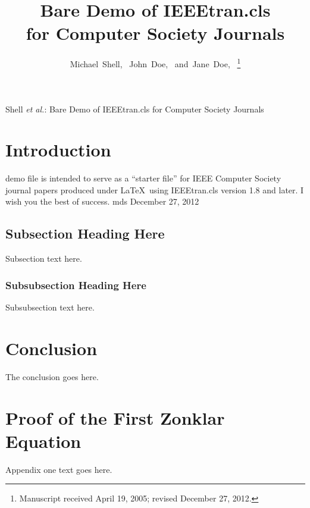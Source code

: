 \documentclass[12pt,journal,compsoc]{IEEEtran}
\begin{document}
\title{Bare Demo of IEEEtran.cls\\ for Computer Society Journals}
\author{Michael~Shell,~
        John~Doe,~
        and~Jane~Doe,~%
\thanks{Manuscript received April 19, 2005; revised December 27, 2012.}}
%
{Shell \MakeLowercase{\textit{et al.}}: Bare Demo of IEEEtran.cls for Computer Society Journals}
\maketitle
\IEEEdisplaynontitleabstractindextext
\IEEEpeerreviewmaketitle
\section{Introduction}
 demo file is intended to serve as a ``starter file''
for IEEE Computer Society journal papers produced under \LaTeX\ using
IEEEtran.cls version 1.8 and later.
I wish you the best of success.
\hfill mds
\hfill December 27, 2012
\subsection{Subsection Heading Here}
Subsection text here.
\subsubsection{Subsubsection Heading Here}
Subsubsection text here.
\section{Conclusion}
The conclusion goes here.
\appendices
\section{Proof of the First Zonklar Equation}
Appendix one text goes here.
\end{document}
